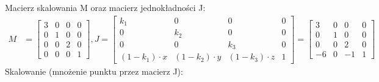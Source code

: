 \documentclass[a4paper]{article}
\begin{document}
\noindent Macierz skalowania M oraz macierz jednokładności J:
\begin{align*}
M &= 
\left[
\begin{matrix}
3 & 0 & 0 & 0\\
0 & 1 & 0 & 0\\
0 & 0 & 2 & 0\\
0 & 0 & 0 & 1
\end{matrix}
\right] , 
J = 
\left[
\begin{matrix}
k_1 & 0 & 0 & 0\\
0 & k_2 & 0 & 0\\
0 & 0 & k_3 & 0\\
(1-k_1) \cdot x & (1-k_2) \cdot y & (1-k_3) \cdot z & 1
\end{matrix}
\right]
=
\left[
\begin{matrix}
3 & 0 & 0 & 0\\
0 & 1 & 0 & 0\\
0 & 0 & 2 & 0\\
-6 & 0 & -1 & 1
\end{matrix}
\right]
\end{align*}
Skalowanie (mnożenie punktu przez macierz J):\\
\end{document}
